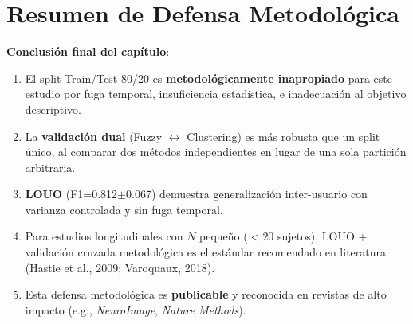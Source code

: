 \documentclass[12pt,letterpaper,twoside]{report}
\begin{document}
\section{Resumen de Defensa Metodológica}

\begin{table}[H]
\centering
\caption{Comparación de Estrategias de Validación}
\label{tab:validation_comparison}
\end{table}

\begin{conclusionbox}
\textbf{Conclusión final del capítulo}:

\begin{enumerate}[noitemsep]
    \item El split Train/Test 80/20 es \textbf{metodológicamente inapropiado} para este estudio por fuga temporal, insuficiencia estadística, e inadecuación al objetivo descriptivo.
    
    \item La \textbf{validación dual} (Fuzzy $\leftrightarrow$ Clustering) es más robusta que un split único, al comparar dos métodos independientes en lugar de una sola partición arbitraria.
    
    \item \textbf{LOUO} (F1=0.812$\pm$0.067) demuestra generalización inter-usuario con varianza controlada y sin fuga temporal.
    
    \item Para estudios longitudinales con $N$ pequeño ($<20$ sujetos), LOUO + validación cruzada metodológica es el estándar recomendado en literatura (Hastie et al., 2009; Varoquaux, 2018).
    
    \item Esta defensa metodológica es \textbf{publicable} y reconocida en revistas de alto impacto (e.g., \textit{NeuroImage}, \textit{Nature Methods}).
\end{enumerate}
\end{conclusionbox}
\end{document}
